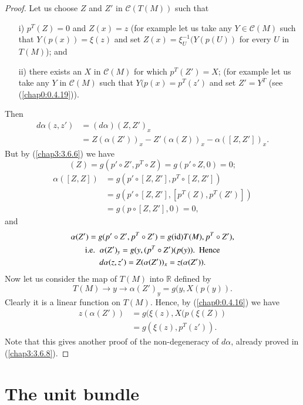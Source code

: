 \begin{proof}
Let us choose $Z$ and $Z'$ in $\mathscr{C}(T(M))$ such that
\begin{itemize}
\item[i)] $p^{T}(Z)=0$ and $Z(x)=z$ (for example let us take any
  $Y\in\mathscr{C}(M)$ such that $Y(p(x))=\xi(z)$ and set
  $Z(x)=\xi^{-1}_{U}(Y(p(U))$ for every $U$ in $T(M)$); and

\item[ii)] there exists an $X$ in $\mathscr{C}(M)$ for which
  $p^{T}(Z')=X$; (for example let us take any $Y$ in $\mathscr{C}(M)$
  such that $Y(p(x)=p^{T}(z')$ and set $Z'=Y^{T}$ (see
  (\ref{chap0:0.4.19})).
\end{itemize}
Then
\begin{align*}
d\alpha (z,z') &= (d\alpha)(Z,Z')_{x}\\
               &= Z(\alpha(Z'))_{x}-Z'(\alpha(Z))_{x}-\alpha([Z,Z'])_{x}.
\end{align*}
But \pageoriginale by (\ref{chap3:3.6.6}) we have
$$
(Z)=g(p'\circ Z',p^{T}\circ Z)=g(p'\circ Z,0)=0;
$$
\begin{align*}
\alpha([Z,Z]) &= g(p'\circ[Z,Z'],p^{T}\circ [Z,Z'])\\
              &= g(p'\circ[Z,Z'],[p^{T}(Z),p^{T}(Z')])\\
              &= g(p\circ[Z,Z'],0)=0,
\end{align*}
and
\begin{gather*}
\alpha(Z')=g(p'\circ Z',p^{T}\circ Z')=g(\operatorname{id})T(M),p^{T}\circ Z'),\\
\text{i.e. \ } \alpha(Z')_{y}=g(y,(p^{T}\circ Z')(p(y)).\text{
  \ Hence}\\
d\alpha(z,z')=Z(\alpha(Z'))_{x}=z(\alpha(Z')).
\end{gather*}
Now let us consider the map of $T(M)$ into $\mathbb{R}$ defined by
$$
T(M)\to y\to \alpha(Z')_{y}=g(y,X(p(y)).
$$
Clearly it is a linear function on $T(M)$. Hence, by (\ref{chap0:0.4.16}) we
have
\begin{align*}
z(\alpha(Z')) &= g(\xi(z),X(p(\xi(Z))\\
              &= g(\xi(z),p^{T}(z')).
\end{align*}
Note that this gives another proof of the non-degeneracy of $d\alpha$,
already proved in (\ref{chap3:3.6.8}).
\end{proof}

\section{The unit bundle}\label{chap3:sec7}

